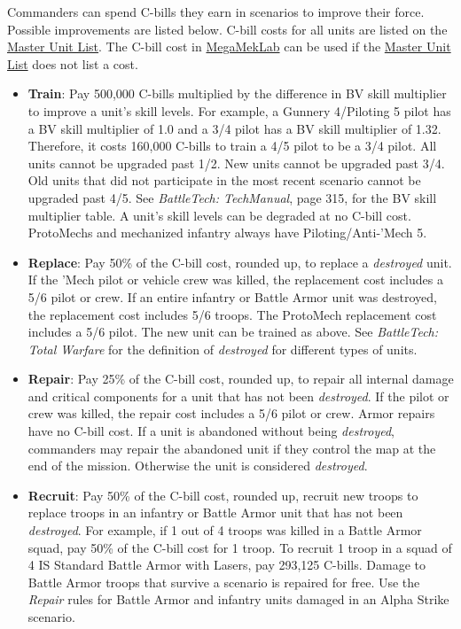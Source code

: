 Commanders can spend C-bills they earn in scenarios to improve their force.
Possible improvements are listed below.
C-bill costs for all units are listed on the \href{http://www.masterunitlist.info}{Master Unit List}.
The C-bill cost in \href{https://megamek.org}{MegaMekLab} can be used if the \href{http://www.masterunitlist.info}{Master Unit List} does not list a cost.

\begin{itemize}

\item {\bfseries Train}: Pay 500,000 C-bills multiplied by the difference in BV skill multiplier to improve a unit's skill levels.
For example, a Gunnery 4/Piloting 5 pilot has a BV skill multiplier of 1.0 and a 3/4 pilot has a BV skill multiplier of 1.32.
Therefore, it costs 160,000 C-bills to train a 4/5 pilot to be a 3/4 pilot.
All units cannot be upgraded past 1/2.
New units cannot be upgraded past 3/4.
Old units that did not participate in the most recent scenario cannot be upgraded past 4/5.
See \emph{BattleTech: TechManual}, page 315, for the BV skill multiplier table.
A unit's skill levels can be degraded at no C-bill cost.
ProtoMechs and mechanized infantry always have Piloting/Anti-'Mech 5.

\item {\bfseries Replace}: Pay 50\% of the C-bill cost, rounded up, to replace a \emph{destroyed} unit.
If the 'Mech pilot or vehicle crew was killed, the replacement cost includes a 5/6 pilot or crew.
If an entire infantry or Battle Armor unit was destroyed, the replacement cost includes 5/6 troops.
The ProtoMech replacement cost includes a 5/6 pilot.
The new unit can be trained as above.
See \emph{BattleTech: Total Warfare} for the definition of \emph{destroyed} for different types of units.

\item {\bfseries Repair}: Pay 25\% of the C-bill cost, rounded up, to repair all internal damage and critical components for a unit that has not been \emph{destroyed}.
If the pilot or crew was killed, the repair cost includes a 5/6 pilot or crew.
Armor repairs have no C-bill cost.
If a unit is abandoned without being \emph{destroyed}, commanders may repair the abandoned unit if they control the map at the end of the mission.
Otherwise the unit is considered \emph{destroyed}.

\item {\bfseries Recruit}: Pay 50\% of the C-bill cost, rounded up, recruit new troops to replace troops in an infantry or Battle Armor unit that has not been \emph{destroyed}.
For example, if 1 out of 4 troops was killed in a Battle Armor squad, pay 50\% of the C-bill cost for 1 troop.
To recruit 1 troop in a squad of 4 IS Standard Battle Armor with Lasers, pay 293,125 C-bills.
Damage to Battle Armor troops that survive a scenario is repaired for free.
Use the \emph{Repair} rules for Battle Armor and infantry units damaged in an Alpha Strike scenario.


\end{itemize}
